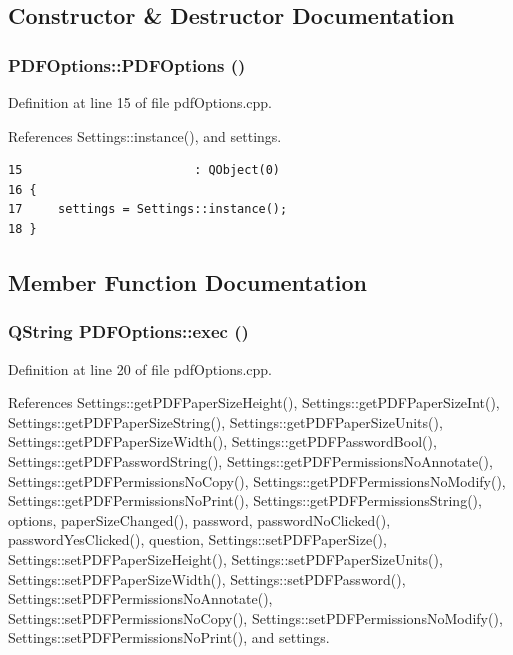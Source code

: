 \subsection{Constructor \& Destructor Documentation}
\hypertarget{classPDFOptions_a0}{
\subsubsection[PDFOptions]{\setlength{\rightskip}{0pt plus 5cm}PDFOptions::PDFOptions ()}}
\label{classPDFOptions_a0}


Definition at line 15 of file pdf\-Options.cpp.

References Settings::instance(), and settings.

\footnotesize\begin{verbatim}15                        : QObject(0)
16 {
17     settings = Settings::instance();
18 }
\end{verbatim}\normalsize 




\subsection{Member Function Documentation}
\hypertarget{classPDFOptions_a1}{
\subsubsection[exec]{\setlength{\rightskip}{0pt plus 5cm}QString PDFOptions::exec ()}}
\label{classPDFOptions_a1}


Definition at line 20 of file pdf\-Options.cpp.

References Settings::get\-PDFPaper\-Size\-Height(), Settings::get\-PDFPaper\-Size\-Int(), Settings::get\-PDFPaper\-Size\-String(), Settings::get\-PDFPaper\-Size\-Units(), Settings::get\-PDFPaper\-Size\-Width(), Settings::get\-PDFPassword\-Bool(), Settings::get\-PDFPassword\-String(), Settings::get\-PDFPermissions\-No\-Annotate(), Settings::get\-PDFPermissions\-No\-Copy(), Settings::get\-PDFPermissions\-No\-Modify(), Settings::get\-PDFPermissions\-No\-Print(), Settings::get\-PDFPermissions\-String(), options, paper\-Size\-Changed(), password, password\-No\-Clicked(), password\-Yes\-Clicked(), question, Settings::set\-PDFPaper\-Size(), Settings::set\-PDFPaper\-Size\-Height(), Settings::set\-PDFPaper\-Size\-Units(), Settings::set\-PDFPaper\-Size\-Width(), Settings::set\-PDFPassword(), Settings::set\-PDFPermissions\-No\-Annotate(), Settings::set\-PDFPermissions\-No\-Copy(), Settings::set\-PDFPermissions\-No\-Modify(), Settings::set\-PDFPermissions\-No\-Print(), and settings.

